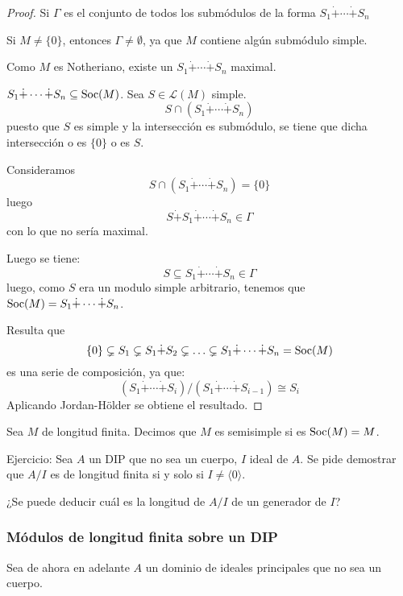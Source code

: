 \begin{proof}
  Si \(\Gamma\) es el conjunto de todos los submódulos de la forma
  \(
    S_1\dot{+}\cdots\dot{+} S_n
  \)

  Si \(M\neq\{0\}\), entonces \(\Gamma\neq\emptyset\), ya que \(M\)
  contiene algún submódulo simple.

  Como \(M\) es Notheriano, existe un
  \(
    S_1\dot{+}\cdots\dot{+} S_n
  \) maximal.

  \(
    S_1\dot{+}\cdots\dot{+} S_n\subseteq\operatorname{Soc}(M)
  \). Sea \(S\in\mathcal{L}(M)\) simple.
  \[
    S\cap(
    S_1\dot{+}\cdots\dot{+} S_n
    )
  \]
  puesto que \(S\) es simple y la intersección es submódulo, se tiene
  que dicha intersección o es \(\{0\}\) o es \(S\).

  Consideramos
  \[
    S\cap(
    S_1\dot{+}\cdots\dot{+} S_n
    ) = \{0\}
  \]
  luego
  \[
    S\dot{+}S_1\dot{+}\cdots\dot{+} S_n\in\Gamma
  \]
  con lo que no sería maximal.

  Luego se tiene:
  \[
    S\subseteq
    S_1\dot{+}\cdots\dot{+} S_n\in\Gamma
  \]
  luego, como \(S\) era un modulo simple arbitrario, tenemos que
  \(\operatorname{Soc}(M)=
    S_1\dot{+}\cdots\dot{+} S_n
  \).

  Resulta que
  \[
    \{0\}\subsetneq S_1\subsetneq S_1\dot{+} S_2\subsetneq\ldots
    \subsetneq
    S_1\dot{+}\cdots\dot{+} S_n=\operatorname{Soc}(M)
  \]
  es una serie de composición, ya que:
  \[
    (S_1\dot{+}\cdots\dot{+} S_i)/
    (S_1\dot{+}\cdots\dot{+} S_{i-1})\cong
    S_i
  \]
  Aplicando Jordan-Hölder se obtiene el resultado.
\end{proof}

\begin{df}
  Sea \(M\) de longitud finita. Decimos que \(M\) es semisimple si es
  \(\operatorname{Soc}(M)=M\).
\end{df}

Ejercicio: Sea \(A\) un DIP que no sea un cuerpo,
\(I\) ideal de \(A\). Se pide demostrar
que \(A/I\) es de longitud finita si y solo si \(I\neq\langle 0\rangle\).

¿Se puede deducir cuál es la longitud de \(A/I\) de un generador de \(I\)?

\subsubsection{Módulos de longitud finita sobre un DIP}

Sea de ahora en adelante \(A\) un dominio de ideales principales que no
sea un cuerpo.

